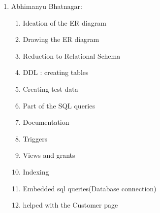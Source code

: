 \documentclass[12pt]{report}
\begin{document}
	\begin{enumerate}
		\item Abhimanyu Bhatnagar:
			\begin{enumerate}
				\item Ideation of the ER diagram
				\item Drawing the ER diagram
				\item Reduction to Relational Schema
				\item DDL : creating tables
				\item Creating test data
				\item Part of the SQL queries
				\item Documentation
				\item Triggers
                \item Views and grants
                \item Indexing
                \item Embedded sql queries(Database connection)
                \item helped with the Customer page
		

\end{enumerate}
\end{enumerate}
\end{document}
